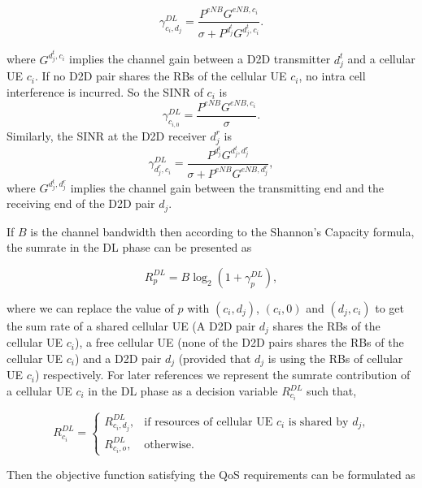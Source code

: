 \documentclass[times]{dacauth}
\begin{document}
 \begin{equation}\label{eqn:sinr_c}
	\gamma_{c_i,d_j}^{DL} = \frac{P^{eNB}G^{eNB,c_i}}{\sigma + P^{d_j^t}G^{d_j^t,c_i}}.
 \end{equation}
 
\smallskip
\noindent
where $G^{d_j^t,c_i}$ implies the channel gain between a D2D transmitter $d_j^t$ and a cellular UE $c_i$.  
If no D2D pair shares the RBs of the cellular UE $c_i$, no intra cell interference is incurred. So the SINR of $c_i$ is
 \begin{equation}\label{eqn:sinr_c0}
 \gamma_{c_{i,0}}^{DL} = \frac{P^{eNB}G^{eNB,c_i}}{\sigma}.
 \end{equation} Similarly, the SINR at the D2D receiver $d_j^r$ \cite{zulhasnine} is
\begin{equation}\label{eqn:sinr_d}
 \gamma_{d_j^r,c_i}^{DL} = \frac{P^{d_j^t}G^{{d_j^t},d_j^r}}{\sigma + P^{ eNB}G^{ eNB,d_j^r}},
\end{equation}
where $G^{d_j^t,d_j^r}$ implies the channel gain between the transmitting end and the receiving end of the D2D pair $d_j$. 

\smallskip
\noindent
If $B$ is the channel bandwidth then according to the Shannon's Capacity formula, the sumrate in the DL phase can be presented as

\begin{equation}
	R_{p}^{DL} = B\log_{2}(1+\gamma_{p}^{DL}),
\end{equation}

\noindent
where we can replace the value of $p$ with $(c_i,d_j)$, $(c_i,0)$ and $(d_j,c_i)$ to get the sum rate of a shared cellular UE (A D2D pair $d_j$ shares the RBs of the cellular UE $c_i$), a free cellular UE (none of the D2D pairs shares the RBs of the cellular UE $c_i$) and a D2D pair $d_j$ (provided that $d_j$ is using the RBs of cellular UE $c_i$) respectively. For later references we represent the sumrate contribution of a cellular UE $c_i$ in the DL phase as a decision variable $R_{c_i}^{DL}$  such that,

	\[ R_{c_i}^{DL} = \left\{ \begin{array}{ll}
         R_{c_i,d_j}^{DL}, & \mbox{if resources of cellular UE $c_i$ is shared by $d_j$,}\\
         R_{c_i,o}^{DL}, & \mbox{otherwise}.\end{array} \right. \]  

\noindent
Then the objective function satisfying the QoS requirements can be formulated as 
\end{document}
